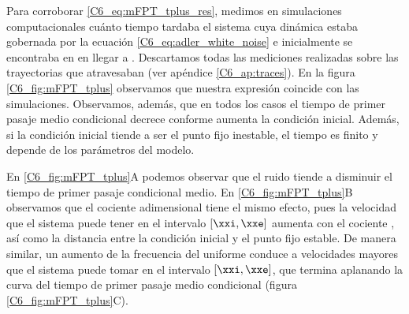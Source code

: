 {Para corroborar \ref{C6_eq:mFPT_tplus_res}, medimos en simulaciones computacionales cuánto tiempo tardaba el sistema cuya dinámica estaba gobernada por la ecuación \ref{C6_eq:adler_white_noise} e inicialmente se encontraba en \xx en llegar a \xxe. Descartamos todas las mediciones realizadas sobre las trayectorias que atravesaban \xxi (ver apéndice \ref{C6_ap:traces}). En la figura \ref{C6_fig:mFPT_tplus} observamos que nuestra expresión coincide con las simulaciones. Observamos, además, que en todos los casos el tiempo de primer pasaje medio condicional decrece conforme aumenta la condición inicial. Además, si la condición inicial tiende a ser el punto fijo inestable, el tiempo es finito y depende de los parámetros del modelo. 


En \ref{C6_fig:mFPT_tplus}A podemos observar que el ruido tiende a disminuir el tiempo de primer pasaje condicional medio. En \ref{C6_fig:mFPT_tplus}B observamos que el cociente adimensional \ddelta tiene el mismo efecto, pues la velocidad que el sistema puede tener en el intervalo $[\xxi,\xxe]$ aumenta con el cociente \ddelta, así como la distancia entre la condición inicial \xx y el punto fijo estable. De manera similar, un aumento de la frecuencia del uniforme conduce a velocidades mayores que el sistema puede tomar en el intervalo $[\xxi,\xxe]$, que termina aplanando la curva del tiempo de primer pasaje medio condicional (figura \ref{C6_fig:mFPT_tplus}C). 


}
